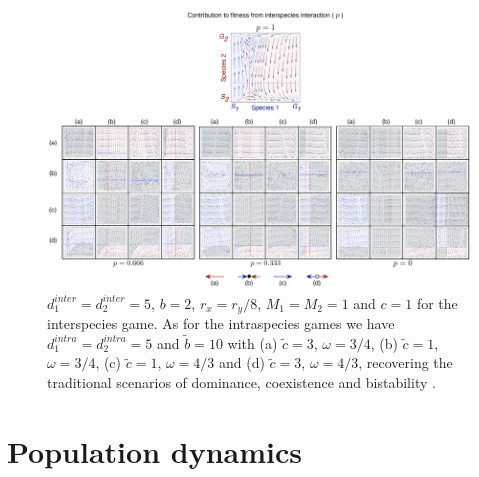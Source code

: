 \documentclass[12pt]{article}
\begin{document}
\begin{appendices}
\begin{figure}
    \includegraphics[width=\columnwidth]{../Figures/Dynamicsacrossp_reduced.pdf}
    \caption{
$d_1^{inter} = d_2^{inter} = 5$, $b = 2$, $r_x = r_y/8$, $M_1 = M_2 = 1$ and $c=1$ for the interspecies game. As for the intraspecies games we have $d_1^{intra} = d_2^{intra} = 5$ and $\tilde{b} = 10 $ with 
(a) $\tilde{c} = 3$, $\omega = 3/4$, 
(b) $\tilde{c} = 1$, $\omega = 3/4$, 
(c) $\tilde{c} = 1$, $\omega = 4/3$ and 
(d) $\tilde{c} = 3$, $\omega = 4/3$, recovering the traditional scenarios of dominance, coexistence and bistability \citep{hauert:JTB:2006a}.
\label{fig:appendix}
}
\end{figure}


\section{Population dynamics}


\end{appendices}
\end{document}
